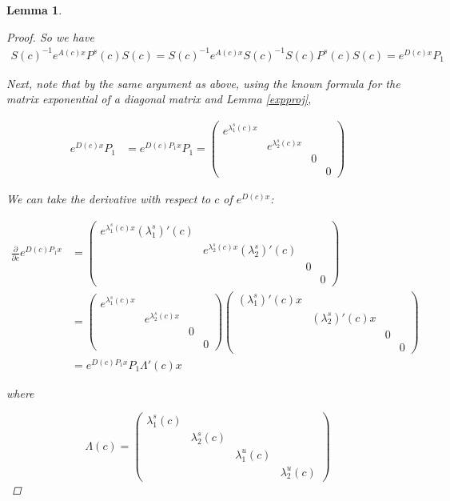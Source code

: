 \documentclass[12pt]{article}
\newtheorem{lemma}{Lemma}
\begin{document}
\begin{lemma}
\begin{proof}
So we have
\begin{align*}
S(c)^{-1} e^{A(c) x} P^s(c) S(c) = S(c)^{-1} e^{A(c) x} S(c)^{-1} S(c) P^s(c) S(c) = e^{D(c) x} P_1
\end{align*}

Next, note that by the same argument as above, using the known formula for the matrix exponential of a diagonal matrix and Lemma \ref{expproj},

\begin{align*}
e^{D(c) x} P_1 &= e^{ D(c)P_1 x} P_1 = 
\begin{pmatrix}
e^{\lambda^s_1(c) x} &&& \\ & e^{\lambda^s_2(c) x} && \\ && 0 & \\ &&& 0 
\end{pmatrix}
\end{align*}

We can take the derivative with respect to $c$ of $e^{D(c) x}$:

\begin{align*}
\frac{\partial}{\partial c} e^{D(c) P_1 x} &=
\begin{pmatrix}
e^{\lambda^s_1(c) x} (\lambda^s_1)'(c) &&& \\ & e^{\lambda^s_2(c) x} (\lambda^s_2)'(c) && \\ && 0 & \\ &&& 0 
\end{pmatrix} \\
&= \begin{pmatrix}
e^{\lambda^s_1(c) x} &&& \\ & e^{\lambda^s_2(c) x}  && \\ && 0 & \\ &&& 0 
\end{pmatrix}
\begin{pmatrix} (\lambda^s_1)'(c) x &&& \\ & (\lambda^s_2)'(c) x && \\ && 0 & \\ &&& 0 \end{pmatrix}  \\
&= e^{D(c) P_1 x} P_1 \Lambda'(c) x
\end{align*}

where

\[
\Lambda(c) = \begin{pmatrix} \lambda^s_1(c) &&& \\ & \lambda^s_2(c)  && \\ 
&& \lambda^u_1(c)  & \\ &&& \lambda^u_2(c)  \end{pmatrix}
\]


\end{proof}
\end{lemma}
\end{document}
